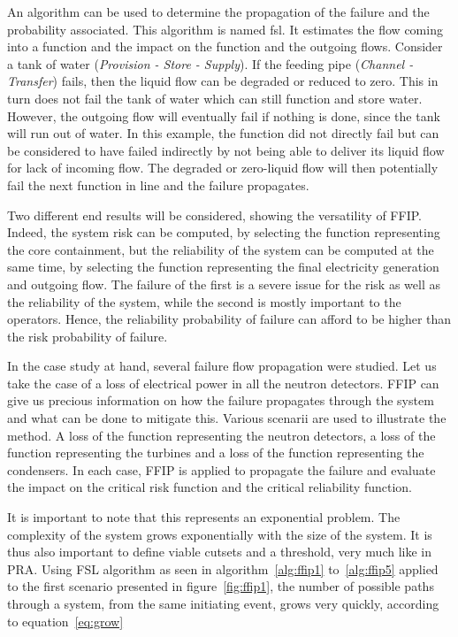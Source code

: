 An algorithm can be used to determine the propagation of the failure and the probability associated. This algorithm is named \gls{fsl}. It estimates the flow coming into a function and the impact on the function and the outgoing flows. Consider a tank of water (\textit{Provision - Store - Supply}). If the feeding pipe (\textit{Channel - Transfer}) fails, then the liquid flow can be degraded or reduced to zero. This in turn does not fail the tank of water which can still function and store water. However, the outgoing flow will eventually fail if nothing is done, since the tank will run out of water. In this example, the function did not directly fail but can be considered to have failed indirectly by not being able to deliver its liquid flow for lack of incoming flow. The degraded or zero-liquid flow will then potentially fail the next function in line and the failure propagates.

Two different end results will be considered, showing the versatility of FFIP. Indeed, the system risk can be computed, by selecting the function representing the core containment, but the reliability of the system can be computed at the same time, by selecting the function representing the final electricity generation and outgoing flow. The failure of the first is a severe issue for the risk as well as the reliability of the system, while the second is mostly important to the operators. Hence, the reliability probability of failure can afford to be higher than the risk probability of failure.

In the case study at hand, several failure flow propagation were studied. Let us take the case of a loss of electrical power in all the neutron detectors. FFIP can give us precious information on how the failure propagates through the system and what can be done to mitigate this. Various scenarii are used to illustrate the method. A loss of the function representing the neutron detectors, a loss of the function representing the turbines and a loss of the function representing the condensers. In each case, FFIP is applied to propagate the failure and evaluate the impact on the critical risk function and the critical reliability function.

It is important to note that this represents an exponential problem. The complexity of the system grows exponentially with the size of the system. It is thus also important to define viable cutsets and a threshold, very much like in PRA. Using FSL algorithm as seen in algorithm~\ref{alg:ffip1} to~\ref{alg:ffip5} applied to the first scenario presented in figure~\ref{fig:ffip1}, the number of possible paths through a system, from the same initiating event, grows very quickly, according to equation~\ref{eq:grow}

